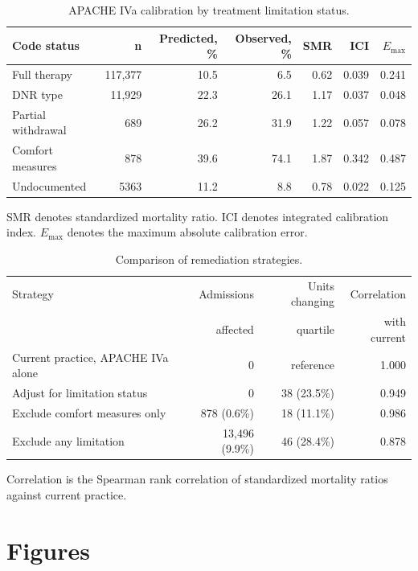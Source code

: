 \documentclass[12pt,a4paper]{article}
\begin{document}
\begin{table}[htbp]
\centering
\small
\caption{APACHE IVa calibration by treatment limitation status.}
\label{tab:calibration}
\begin{tabular}{lrrrrrr}
\toprule
Code status & n & Predicted, \% & Observed, \% & SMR & ICI & $E_{\max}$ \\
\midrule
Full therapy        & 117{,}377 & 10.5 & 6.5  & 0.62 & 0.039 & 0.241 \\
DNR type            & 11{,}929  & 22.3 & 26.1 & 1.17 & 0.037 & 0.048 \\
Partial withdrawal  & 689       & 26.2 & 31.9 & 1.22 & 0.057 & 0.078 \\
Comfort measures    & 878       & 39.6 & 74.1 & 1.87 & 0.342 & 0.487 \\
Undocumented        & 5363      & 11.2 & 8.8  & 0.78 & 0.022 & 0.125 \\
\bottomrule
\end{tabular}

\vspace{2pt}
\footnotesize SMR denotes standardized mortality ratio. ICI denotes integrated
calibration index. $E_{\max}$ denotes the maximum absolute calibration error.
\end{table}

\begin{table}[htbp]
\centering
\small
\caption{Comparison of remediation strategies.}
\label{tab:remedy}
\begin{tabular}{lrrr}
\toprule
Strategy & Admissions & Units changing & Correlation \\
 & affected & quartile & with current \\
\midrule
Current practice, APACHE IVa alone & 0 & reference & 1.000 \\
Adjust for limitation status       & 0 & 38 (23.5\%) & 0.949 \\
Exclude comfort measures only      & 878 (0.6\%) & 18 (11.1\%) & 0.986 \\
Exclude any limitation             & 13{,}496 (9.9\%) & 46 (28.4\%) & 0.878 \\
\bottomrule
\end{tabular}

\vspace{2pt}
\footnotesize Correlation is the Spearman rank correlation of standardized
mortality ratios against current practice.
\end{table}

\newpage
\section*{Figures}
\end{document}
